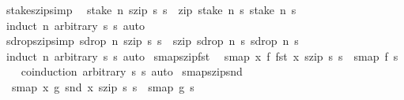 \begin{isabellebody}
%
\endisadelimproof
\isanewline
{}\isamarkupfalse%
\ stake{\isacharunderscore}szip{\isacharbrackleft}simp{\isacharbrackright}{\isacharcolon}\isanewline
\ \ {\isachardoublequoteopen}stake\ n\ {\isacharparenleft}szip\ s{}\ s{}{\isacharparenright}\ {\isacharequal}\ zip\ {\isacharparenleft}stake\ n\ s{}{\isacharparenright}\ {\isacharparenleft}stake\ n\ s{}{\isacharparenright}{\isachardoublequoteclose}\isanewline
%
\isadelimproof
\ \ %
\endisadelimproof
%
\isatagproof
{}\isamarkupfalse%
\ {\isacharparenleft}induct\ n\ arbitrary{\isacharcolon}\ s{}\ s{}{\isacharparenright}\ auto%
\endisatagproof
{\isafoldproof}%
%
\isadelimproof
\isanewline
%
\endisadelimproof
\isanewline
{}\isamarkupfalse%
\ sdrop{\isacharunderscore}szip{\isacharbrackleft}simp{\isacharbrackright}{\isacharcolon}\ {\isachardoublequoteopen}sdrop\ n\ {\isacharparenleft}szip\ s{}\ s{}{\isacharparenright}\ {\isacharequal}\ szip\ {\isacharparenleft}sdrop\ n\ s{}{\isacharparenright}\ {\isacharparenleft}sdrop\ n\ s{}{\isacharparenright}{\isachardoublequoteclose}\isanewline
%
\isadelimproof
\ \ %
\endisadelimproof
%
\isatagproof
{}\isamarkupfalse%
\ {\isacharparenleft}induct\ n\ arbitrary{\isacharcolon}\ s{}\ s{}{\isacharparenright}\ auto%
\endisatagproof
{\isafoldproof}%
%
\isadelimproof
\isanewline
%
\endisadelimproof
\isanewline
{}\isamarkupfalse%
\ smap{\isacharunderscore}szip{\isacharunderscore}fst{\isacharcolon}\isanewline
\ \ {\isachardoublequoteopen}smap\ {\isacharparenleft}{\isasymlambda}x{\isachardot}\ f\ {\isacharparenleft}fst\ x{\isacharparenright}{\isacharparenright}\ {\isacharparenleft}szip\ s{}\ s{}{\isacharparenright}\ {\isacharequal}\ smap\ f\ s{}{\isachardoublequoteclose}\isanewline
%
\isadelimproof
\ \ %
\endisadelimproof
%
\isatagproof
{}\isamarkupfalse%
\ {\isacharparenleft}coinduction\ arbitrary{\isacharcolon}\ s{}\ s{}{\isacharparenright}\ auto%
\endisatagproof
{\isafoldproof}%
%
\isadelimproof
\isanewline
%
\endisadelimproof
\isanewline
{}\isamarkupfalse%
\ smap{\isacharunderscore}szip{\isacharunderscore}snd{\isacharcolon}\isanewline
\ \ {\isachardoublequoteopen}smap\ {\isacharparenleft}{\isasymlambda}x{\isachardot}\ g\ {\isacharparenleft}snd\ x{\isacharparenright}{\isacharparenright}\ {\isacharparenleft}szip\ s{}\ s{}{\isacharparenright}\ {\isacharequal}\ smap\ g\ s{}{\isachardoublequoteclose}\isanewline

\end{isabellebody}
